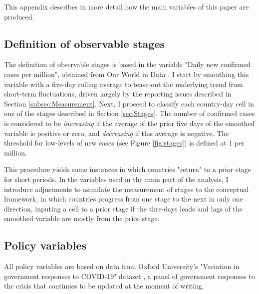 \documentclass[12pt,english]{article}
\begin{document}
This appendix describes in more detail how the main variables of this paper are produced.

\subsection{Definition of observable stages}

The definition of observable stages is based in the variable "Daily new confirmed cases per million", obtained from Our World in Data \citep{Roser2020}. I start by smoothing this variable with a five-day rolling average to tease-out the underlying trend from short-term fluctuations, driven largely by the reporting issues described in Section \ref{subsec:Measurement}.  Next, I proceed to classify each country-day cell in one of the stages described in Section \ref{sec:Stages}. The number of confirmed cases is considered to be \emph{increasing} if the average of the prior five days of the smoothed variable is positive or zero, and \emph{decreasing} if this average is negative. The threshold for low-levels of new cases (see Figure \ref{fig:stages}) is defined at 1 per million.

This procedure yields some instances in which countries "return" to a prior stage for short periods. In the variables used in the main part of the analysis, I introduce adjustments to asimilate the measurement of stages to the conceptual framework, in which countries progress from one stage to the next in only one direction, inputing a cell to a prior stage if the thre-days leads and lags of the smoothed variable are mostly from the prior stage.

\subsection{Policy variables}

All policy variables are based on data from Oxford University's "Variation in government responses to COVID-19" dataset  \citep{Hale2020}, a panel of government responses to the crisis that continues to be updated at the moment of writing.

\newpage
\end{document}
